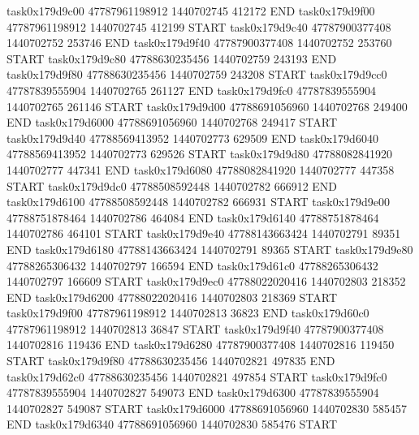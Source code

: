 task0x179d9c00 47787961198912          1440702745               412172  END
task0x179d9f00 47787961198912          1440702745               412199  START
task0x179d9c40 47787900377408          1440702752               253746  END
task0x179d9f40 47787900377408          1440702752               253760  START
task0x179d9c80 47788630235456          1440702759               243193  END
task0x179d9f80 47788630235456          1440702759               243208  START
task0x179d9cc0 47787839555904          1440702765               261127  END
task0x179d9fc0 47787839555904          1440702765               261146  START
task0x179d9d00 47788691056960          1440702768               249400  END
task0x179d6000 47788691056960          1440702768               249417  START
task0x179d9d40 47788569413952          1440702773               629509  END
task0x179d6040 47788569413952          1440702773               629526  START
task0x179d9d80 47788082841920          1440702777               447341  END
task0x179d6080 47788082841920          1440702777               447358  START
task0x179d9dc0 47788508592448          1440702782               666912  END
task0x179d6100 47788508592448          1440702782               666931  START
task0x179d9e00 47788751878464          1440702786               464084  END
task0x179d6140 47788751878464          1440702786               464101  START
task0x179d9e40 47788143663424          1440702791                89351  END
task0x179d6180 47788143663424          1440702791                89365  START
task0x179d9e80 47788265306432          1440702797               166594  END
task0x179d61c0 47788265306432          1440702797               166609  START
task0x179d9ec0 47788022020416          1440702803               218352  END
task0x179d6200 47788022020416          1440702803               218369  START
task0x179d9f00 47787961198912          1440702813                36823  END
task0x179d60c0 47787961198912          1440702813                36847  START
task0x179d9f40 47787900377408          1440702816               119436  END
task0x179d6280 47787900377408          1440702816               119450  START
task0x179d9f80 47788630235456          1440702821               497835  END
task0x179d62c0 47788630235456          1440702821               497854  START
task0x179d9fc0 47787839555904          1440702827               549073  END
task0x179d6300 47787839555904          1440702827               549087  START
task0x179d6000 47788691056960          1440702830               585457  END
task0x179d6340 47788691056960          1440702830               585476  START
